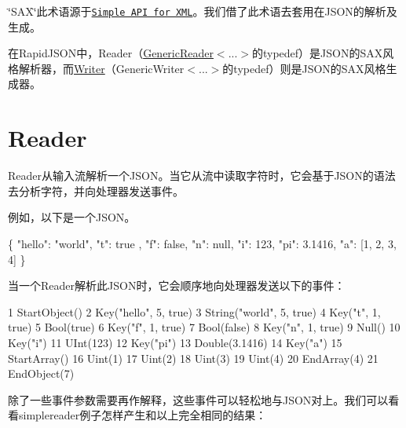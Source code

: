 \char`\"{}\+S\+A\+X\char`\"{}此术语源于\href{http://en.wikipedia.org/wiki/Simple_API_for_XML}{\tt Simple A\+PI for X\+ML}。我们借了此术语去套用在\+J\+S\+O\+N的解析及生成。

在\+Rapid\+J\+S\+O\+N中，{\ttfamily Reader}（{\ttfamily \hyperlink{class_generic_reader}{Generic\+Reader}$<$...$>$}的typedef）是\+J\+S\+O\+N的\+S\+A\+X风格解析器，而{\ttfamily \hyperlink{class_writer}{Writer}}（{\ttfamily Generic\+Writer$<$...$>$}的typedef）则是\+J\+S\+O\+N的\+S\+A\+X风格生成器。\hypertarget{md_Commun_Externe_RapidJSON_doc_sax.zh-cn_Reader}{}\section{Reader}\label{md_Commun_Externe_RapidJSON_doc_sax.zh-cn_Reader}
{\ttfamily Reader}从输入流解析一个\+J\+S\+O\+N。当它从流中读取字符时，它会基于\+J\+S\+O\+N的语法去分析字符，并向处理器发送事件。

例如，以下是一个\+J\+S\+O\+N。


\begin{DoxyCode}
\{
    \textcolor{stringliteral}{"hello"}: \textcolor{stringliteral}{"world"},
    \textcolor{stringliteral}{"t"}: true ,
    \textcolor{stringliteral}{"f"}: \textcolor{keyword}{false},
    \textcolor{stringliteral}{"n"}: null,
    \textcolor{stringliteral}{"i"}: 123,
    \textcolor{stringliteral}{"pi"}: 3.1416,
    \textcolor{stringliteral}{"a"}: [1, 2, 3, 4]
\}
\end{DoxyCode}


当一个{\ttfamily Reader}解析此\+J\+S\+O\+N时，它会顺序地向处理器发送以下的事件：


\begin{DoxyCode}
1 StartObject()
2 Key("hello", 5, true)
3 String("world", 5, true)
4 Key("t", 1, true)
5 Bool(true)
6 Key("f", 1, true)
7 Bool(false)
8 Key("n", 1, true)
9 Null()
10 Key("i")
11 UInt(123)
12 Key("pi")
13 Double(3.1416)
14 Key("a")
15 StartArray()
16 Uint(1)
17 Uint(2)
18 Uint(3)
19 Uint(4)
20 EndArray(4)
21 EndObject(7)
\end{DoxyCode}


除了一些事件参数需要再作解释，这些事件可以轻松地与\+J\+S\+O\+N对上。我们可以看看{\ttfamily simplereader}例子怎样产生和以上完全相同的结果：


